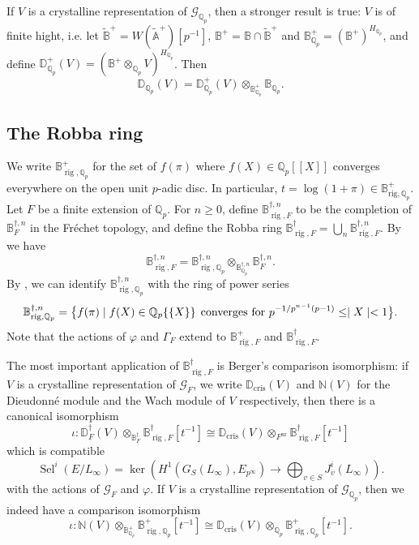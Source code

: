 \documentclass{amsart}
\newcommand{\QQ}{\mathbb Q}
\newcommand{\BB}{\mathbb B}
\newcommand{\DD}{\mathbb D}
\renewcommand{\AA}{\mathbb A}
\newcommand{\NN}{\mathbb N}
\newcommand{\Brig}{\BB^+_{\mathrm{rig},\QQ_p}}
\DeclareMathOperator{\Sel}{Sel}
\DeclareMathOperator{\cris}{cris}
\DeclareMathOperator{\rig}{rig}
\newcommand{\Ep}{E_{p^\infty}}
\newcommand{\Qp}{\QQ_p}
\newcommand{\calG}{\mathcal{G}}
\newcommand{\vp}{\varphi}
\begin{document}
   If $V$ is a crystalline representation of $\calG_{\QQ_p}$, then a stronger result is true: $V$ is of finite hight, i.e.  let $\tilde{\BB}^+=W(\tilde{\AA}^+)[p^{-1}]$, $\BB^+=\BB\cap\tilde{\BB}^+$ and $\BB^+_{\QQ_p}=(\BB^+)^{H_{\QQ_p}}$, and define $\DD^+_{\QQ_p}(V)=(\BB^+\otimes_{\QQ_p}V)^{H_{\QQ_p}}$. Then
   \[ \DD_{\QQ_p}(V)=\DD^+_{\QQ_p}(V)\otimes_{\BB^+_{\QQ_p}}\BB_{\QQ_p}.\]
 
  \subsection{The Robba ring} 
  
   We write $\BB_{\rig,\QQ_p}^+$ for the set of $f(\pi)$ where $f(X)\in\QQ_p[[X]]$ converges everywhere on the open unit $p$-adic disc. In particular, $t=\log(1+\pi)\in\Brig$. Let $F$ be a finite extension of $\QQ_p$. For $n\ge0$, define $\BB^{\dagger,n}_{\rig,F}$ to be the completion of $\BB^{\dagger,n}_{F}$ in the Fr\'echet topology, and define the Robba ring $\BB^{\dagger}_{\rig,F}=\bigcup_n \BB^{\dagger,n}_{\rig,F}$. By \cite[Lemme~3.13]{berger02} we have 
   \[ \BB^{\dagger,n}_{\rig,F}=\BB^{\dagger,n}_{\rig,\QQ_p}\otimes_{\BB^{\dagger,n}_{\QQ_p}}\BB^{\dagger,n}_F.\]
   By \cite[Proposition~I.3]{berger03}, we can identify $\BB^{\dagger,n}_{\rig,\QQ_p}$ with the ring of power series
   \[ \BB^{\dagger,n}_{\rig,\QQ_p}=\big\{ f(\pi)\mid f(X)\in\QQ_p\{\{X\}\} \hspace{1ex}\text{converges for $p^{-1/p^{n-1}(p-1)}\leq\mid X\mid<1$}\big\}.\]
   Note that the actions of $\vp$ and $\Gamma_F$ extend to $\BB^+_{\rig,F}$ and $\BB^\dagger_{\rig,F}$. 
 
   The most important application of $\BB^\dagger_{\rig,F}$ is Berger's comparison isomorphism: if $V$ is a crystalline representation of $\calG_F$, we write $\DD_{\cris}(V)$ and $\NN(V)$ for the Dieudonn\'{e} module and the Wach module of $V$ respectively, then there is a canonical isomorphism 
   \begin{equation}\label{comparison}
    \iota: \DD^\dagger_F(V)\otimes_{\BB^\dagger_F}\BB^\dagger_{\rig,F}[t^{-1}]\cong \DD_{\cris}(V)\otimes_{F^{\mathrm{nr}}}\BB^\dagger_{\rig,F}[t^{-1}]
   \end{equation}
   which is compatible \[ \Sel^i(E\slash L_\infty)=\ker\left( H^1(G_S(L_\infty),\Ep)\rightarrow \bigoplus_{v\in S}J^i_v(L_\infty)\right).\]  with the actions of $\calG_F$ and $\vp$. If $V$ is a crystalline representation of $\calG_{\QQ_p}$, then we indeed have a comparison isomorphism
   \[
    \iota: \NN(V)\otimes_{\BB^+_{\QQ_p}}\BB^+_{\rig,\QQ_p}[t^{-1}]\cong \DD_{\cris}(V)\otimes_{\Qp}\BB^+_{\rig,\QQ_p}[t^{-1}].
   \]
\end{document}
